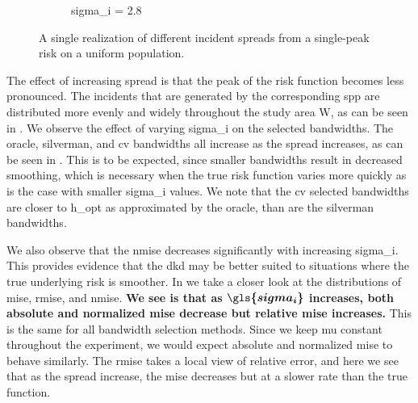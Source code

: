 \begin{figure}[htbp]
\begin{subfigure}{0.45\textwidth}
        \caption{\gls{sigma_i} = 2.8}
    \end{subfigure}
    \caption[Examples showing incident spread]
        {A single realization of different incident \glspl{spread} from a single-peak risk on a uniform population. \scatterplotcaption}
    \label{fig:one_sample:unif_Spreads_1h}
\end{figure}

The effect of increasing \gls{spread} is that the peak of the risk function becomes less pronounced.
The incidents that are generated by the corresponding \gls{spp} are distributed more evenly and widely throughout the study area \gls{W},
as can be seen in .
We observe the effect of varying \gls{sigma_i} on the selected bandwidths.
The \gls{oracle}, \gls{silverman}, and \gls{cv} bandwidths all increase as the spread increases, as can be seen in .
This is to be expected, since smaller bandwidths result in decreased smoothing,
which is necessary when the true risk function varies more quickly as is the case with smaller \gls{sigma_i} values.
We note that the \gls{cv} selected bandwidths are closer to \gls{h_opt} as approximated by the \gls{oracle}, than are the \gls{silverman} bandwidths.



We also observe that the \gls{nmise} decreases significantly with increasing \gls{sigma_i}.
This provides evidence that the \gls{dkd} may be better suited to situations where the true underlying risk is smoother.
In  we take a closer look at the distributions of \gls{mise}, \gls{rmise}, and \gls{nmise}.
\textbf{We see is that as $\boldsymbol{\gls{sigma_i}}$ increases, both absolute and normalized \gls{mise} decrease but relative \gls{mise} increases.}
This is the same for all bandwidth selection methods.
Since we keep \gls{mu} constant throughout the experiment, we would expect absolute and normalized \gls{mise} to behave similarly.
The \gls{rmise} takes a local view of relative error, and here we see that as the \gls{spread} increase, the \gls{mise} decreases but at a slower rate than the true function.



